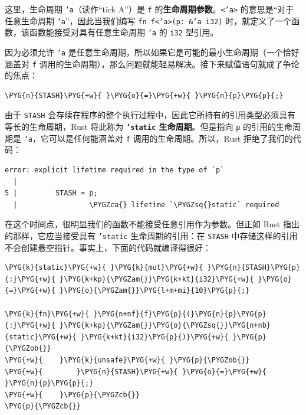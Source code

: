 这里，生命周期 \texttt{'a}（读作“tick A”）是 \texttt{f} 的\textbf{生命周期参数}。\texttt{<'a>} 的意思是“对于任意生命周期 \texttt{'a}”，因此当我们编写 \texttt{fn f<'a>(p: \&'a i32)} 时，就定义了一个函数，该函数能接受对具有任意生命周期 \texttt{'a} 的 \texttt{i32} 型引用。

因为必须允许 \texttt{'a} 是任意生命周期，所以如果它是可能的最小生命周期（一个恰好涵盖对 \texttt{f} 调用的生命周期），那么问题就能轻易解决。接下来赋值语句就成了争论的焦点：

\begin{Verbatim}[commandchars=\\\{\},breaklines=true,breakanywhere=true,fontsize=\codefont,xleftmargin=17bp]
\PYG{n}{STASH}\PYG{+w}{ }\PYG{o}{=}\PYG{+w}{ }\PYG{n}{p}\PYG{p}{;}
\end{Verbatim}

由于 \texttt{STASH} 会存续在程序的整个执行过程中，因此它所持有的引用类型必须具有等长的生命周期，Rust 将此称为 \textbf{\texttt{'static} 生命周期}。但是指向 \texttt{p} 的引用的生命周期是 \texttt{'a}，它可以是任何能涵盖对 \texttt{f} 调用的生命周期。所以，Rust 拒绝了我们的代码：

\begin{Verbatim}[commandchars=\\\{\},breaklines=true,breakanywhere=true,fontsize=\codefont,xleftmargin=17bp]
error: explicit lifetime required in the type of `p`
  |
5 |         STASH = p;
  |                 \PYGZca{} lifetime `\PYGZsq{}static` required
\end{Verbatim}

在这个时间点，很明显我们的函数不能接受任意引用作为参数。但正如 Rust 指出的那样，它应当接受具有 \texttt{'static} 生命周期的引用：在 \texttt{STASH} 中存储这样的引用不会创建悬空指针。事实上，下面的代码就编译得很好：

\begin{Verbatim}[commandchars=\\\{\},breaklines=true,breakanywhere=true,fontsize=\codefont,xleftmargin=17bp]
\PYG{k}{static}\PYG{+w}{ }\PYG{k}{mut}\PYG{+w}{ }\PYG{n}{STASH}\PYG{p}{:}\PYG{+w}{ }\PYG{k+kp}{\PYGZam{}}\PYG{k+kt}{i32}\PYG{+w}{ }\PYG{o}{=}\PYG{+w}{ }\PYG{o}{\PYGZam{}}\PYG{l+m+mi}{10}\PYG{p}{;}

\PYG{k}{fn}\PYG{+w}{ }\PYG{n+nf}{f}\PYG{p}{(}\PYG{n}{p}\PYG{p}{:}\PYG{+w}{ }\PYG{k+kp}{\PYGZam{}}\PYG{o}{\PYGZsq{}}\PYG{n+nb}{static}\PYG{+w}{ }\PYG{k+kt}{i32}\PYG{p}{)}\PYG{+w}{ }\PYG{p}{\PYGZob{}}
\PYG{+w}{    }\PYG{k}{unsafe}\PYG{+w}{ }\PYG{p}{\PYGZob{}}
\PYG{+w}{        }\PYG{n}{STASH}\PYG{+w}{ }\PYG{o}{=}\PYG{+w}{ }\PYG{n}{p}\PYG{p}{;}
\PYG{+w}{    }\PYG{p}{\PYGZcb{}}
\PYG{p}{\PYGZcb{}}
\end{Verbatim}

